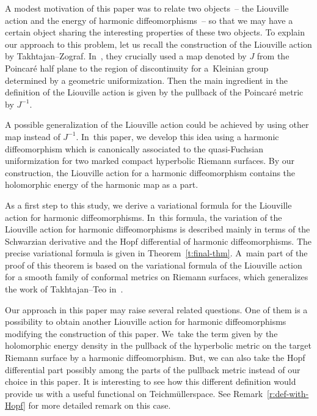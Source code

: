 \documentclass[10pt,a4paper]{amsart}
\numberwithin{equation}{section}
\newcommand{\Te}{Teichm\"{u}ller\:}
\begin{document}
A modest motivation of this paper was to relate two objects~-- the Liouville action and the energy of harmonic diffeomorphisms~-- so that we may
have a certain object sharing the interesting properties of these two objects. To explain our approach to this problem, let us recall the construction of the Liouville action by Takhtajan--Zograf. In~\cite{TZ88-1,TZ88-2}, they crucially used a map
denoted by $J$ from the Poincar\'e half plane to the region of discontinuity for a~Kleinian group determined by a geometric uniformization. Then the main ingredient in the definition of the Liouville action is given by the pullback of the Poincar\'e metric by $J^{-1}$.

A possible generalization of the Liouville action could be achieved by using other map instead of $J^{-1}$. In~this paper, we develop this idea using a harmonic diffeomorphism which is canonically associated to the quasi-Fuchsian uniformization
for two marked compact hyperbolic Riemann surfaces.
By our construction, the Liouville action for a harmonic diffeomorphism contains the holomorphic energy of the harmonic map as a part.

As a first step to this study, we derive a variational formula for the Liouville action for harmonic diffeomorphisms. In~this formula, the variation of the Liouville action for harmonic diffeomorphisms is described mainly in terms of the Schwarzian derivative and the Hopf differential of harmonic diffeomorphisms. The precise variational formula is given in Theorem~\ref{t:final-thm}.
A~main part of the proof of this theorem is based on the variational formula of the Liouville action for a smooth family of conformal metrics on Riemann surfaces, which generalizes the work of Takhtajan--Teo in~\cite{2}.

Our approach in this paper may raise several related questions. One of them is a possibility to obtain another Liouville action for harmonic diffeomorphisms modifying the construction of this paper. We~take the term given by the holomorphic energy density in the pullback of the hyperbolic metric on the target Riemann surface by a harmonic diffeomorphism. But, we can also take
the Hopf differential part possibly among the parts of the pullback metric instead of our choice in this paper.
It is interesting to see how this different definition would provide us with a useful functional on \Te space.
See Remark~\ref{r:def-with-Hopf} for more detailed remark on this case.
\end{document}
